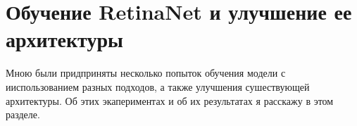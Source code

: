 \section{Обучение RetinaNet и улучшение ее архитектуры}

Мною были придприняты несколько попыток обучения модели с ииспользованием разных подходов, а также улучшения сушествующей архитектуры. Об этих экапериментах и об их результатах я расскажу в этом разделе.






\clearpage